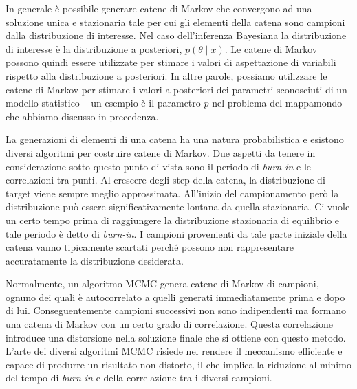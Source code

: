 In generale è possibile generare catene di Markov che convergono ad una soluzione unica e stazionaria tale per cui gli elementi della catena sono campioni dalla distribuzione di interesse.
Nel caso dell'inferenza Bayesiana la distribuzione di interesse è la distribuzione a posteriori, $p(\theta \mid x)$.
Le catene di Markov possono quindi essere utilizzate per stimare i valori di aspettazione di variabili rispetto alla distribuzione a posteriori. 
In altre parole, possiamo utilizzare le catene di Markov per stimare i valori a posteriori dei parametri sconosciuti di un modello statistico -- un esempio è il parametro $p$ nel problema del mappamondo che abbiamo discusso in precedenza.

La generazioni di elementi di una catena ha una natura probabilistica e
esistono diversi algoritmi per costruire catene di Markov. 
Due aspetti da tenere in considerazione sotto questo punto di vista sono il periodo di \emph{burn-in} e le correlazioni tra punti. 
Al crescere degli step della catena, la distribuzione di target viene sempre meglio approssimata. 
All'inizio del campionamento però la distribuzione può essere significativamente lontana da quella stazionaria. 
Ci vuole un certo tempo prima di raggiungere la distribuzione stazionaria
di equilibrio e tale periodo è detto di \emph{burn-in}. 
I campioni provenienti da tale parte iniziale della catena vanno tipicamente scartati perché possono non rappresentare accuratamente la distribuzione desiderata.

Normalmente, un algoritmo MCMC genera catene di Markov di campioni, ognuno dei quali è autocorrelato a quelli generati immediatamente prima e dopo di lui.
Conseguentemente campioni successivi non sono indipendenti ma formano una catena di Markov con un certo grado di correlazione.
Questa correlazione introduce una distorsione nella soluzione finale che si ottiene con questo metodo.
L'arte dei diversi algoritmi MCMC risiede nel rendere il meccanismo efficiente e capace di produrre un risultato non distorto, il che implica la riduzione al minimo del tempo di \emph{burn-in} e della correlazione tra i diversi campioni. 

